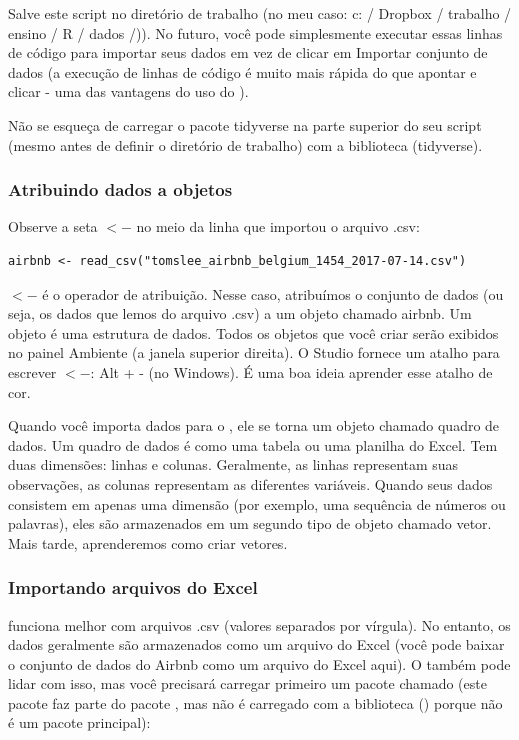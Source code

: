 \documentclass{article}
\begin{document}
Salve este script no diretório de trabalho (no meu caso: c: / Dropbox / trabalho / ensino / R / dados /)). No futuro, você pode simplesmente executar essas linhas de código para importar seus dados em vez de clicar em Importar conjunto de dados (a execução de linhas de código é muito mais rápida do que apontar e clicar - uma das vantagens do uso do \faRProject).

Não se esqueça de carregar o pacote tidyverse na parte superior do seu script (mesmo antes de definir o diretório de trabalho) com a biblioteca (tidyverse).


\subsubsection{Atribuindo dados a objetos}

Observe a seta $<-$ no meio da linha que importou o arquivo .csv:

\begin{lstlisting}
airbnb <- read_csv("tomslee_airbnb_belgium_1454_2017-07-14.csv")
\end{lstlisting}

$<-$ é o operador de atribuição. Nesse caso, atribuímos o conjunto de dados (ou seja, os dados que lemos do arquivo .csv) a um objeto chamado airbnb. Um objeto é uma estrutura de dados. Todos os objetos que você criar serão exibidos no painel Ambiente (a janela superior direita). O \faRProject Studio fornece um atalho para escrever $<-$: Alt + - (no Windows). É uma boa ideia aprender esse atalho de cor.

Quando você importa dados para o \faRProject, ele se torna um objeto chamado quadro de dados. Um quadro de dados é como uma tabela ou uma planilha do Excel. Tem duas dimensões: linhas e colunas. Geralmente, as linhas representam suas observações, as colunas representam as diferentes variáveis. Quando seus dados consistem em apenas uma dimensão (por exemplo, uma sequência de números ou palavras), eles são armazenados em um segundo tipo de objeto chamado vetor. Mais tarde, aprenderemos como criar vetores.

\newpage
\subsubsection{Importando arquivos do Excel}

\faRProject funciona melhor com arquivos .csv (valores separados por vírgula). No entanto, os dados geralmente são armazenados como um arquivo do Excel (você pode baixar o conjunto de dados do Airbnb como um arquivo do Excel aqui). O \faRProject também pode lidar com isso, mas você precisará carregar primeiro um pacote chamado  (este pacote faz parte do pacote , mas não é carregado com a biblioteca () porque não é um pacote  principal):
\end{document}
